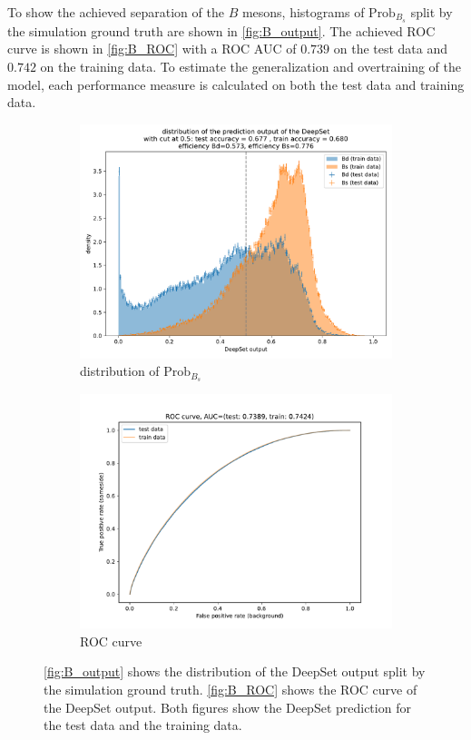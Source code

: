 To show the achieved separation of the $B$ mesons, histograms of $\text{Prob}_{B_s}$ split by the simulation ground truth are shown in \autoref{fig:B_output}.
The achieved ROC curve is shown in \autoref{fig:B_ROC} with a ROC AUC of $0.739$ on the test data and $0.742$ on the training data.
To estimate the generalization and overtraining of the model, each performance measure is calculated on both the test data and training data.

\begin{figure}
    \centering
    \begin{subfigure}{0.5\textwidth}
        \centering
        \includegraphics[width=\textwidth]{images/B_output.pdf}
        \caption{distribution of $\text{Prob}_{B_s}$}
        \label{fig:B_output}
    \end{subfigure}%
    \begin{subfigure}{0.5\textwidth}
        \centering
        \includegraphics[width=\textwidth]{images/B_ROC.pdf}
        \caption{ROC curve}
        \label{fig:B_ROC}
    \end{subfigure}%
    \caption{\autoref{fig:B_output} shows the distribution of the DeepSet output split by the simulation ground truth. \autoref{fig:B_ROC} shows the ROC curve of the DeepSet output. Both figures show the DeepSet prediction for the test data and the training data.}
\end{figure}
